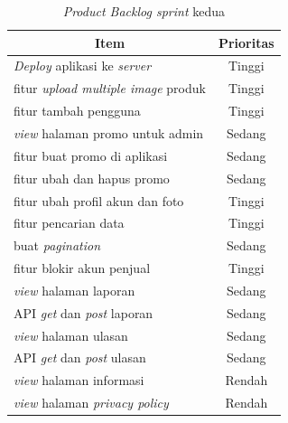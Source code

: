 \begin{enumerate}


	\begin{table}[H]
		\begin{center}
		\caption{\textit{Product Backlog sprint} kedua}
		\label{tab:sprint kedua}
		\begin{tabular}{|l|c|}
		\hline
		\multicolumn{1}{|c|}{Item} & Prioritas\\
		\hline
		\textit{Deploy} aplikasi ke \textit{server} & Tinggi\\
		\hline
		fitur \textit{upload multiple image} produk & Tinggi\\
		\hline
		fitur tambah pengguna & Tinggi\\
		\hline
		\textit{view} halaman promo untuk admin & Sedang\\
		\hline
		fitur buat promo di aplikasi & Sedang\\
		\hline
		fitur ubah dan hapus promo & Sedang\\
		\hline
		fitur ubah profil akun dan foto & Tinggi\\
		\hline
		fitur pencarian data & Tinggi\\
		\hline
		buat \textit{pagination} & Sedang\\
		\hline
		fitur blokir akun penjual & Tinggi\\
		\hline
		\textit{view} halaman laporan & Sedang\\
		\hline
		API \textit{get} dan \textit{post} laporan & Sedang\\
		\hline
		\textit{view} halaman ulasan & Sedang\\
		\hline
		API \textit{get} dan \textit{post} ulasan & Sedang\\
		\hline
		\textit{view} halaman informasi & Rendah\\
		\hline
		\textit{view} halaman \textit{privacy policy} & Rendah\\
		\hline
		\end{tabular}
		\end{center}
	\end{table}


\end{enumerate}

